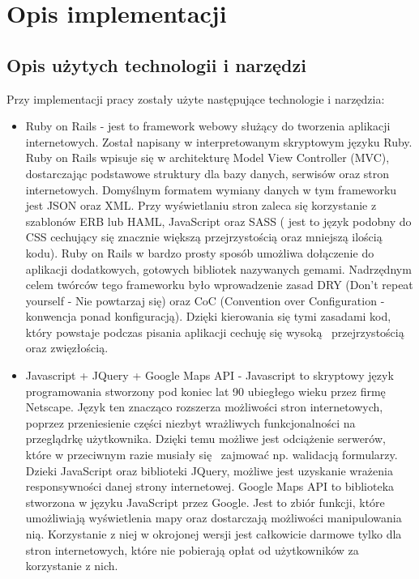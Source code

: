 \chapter{Opis implementacji}
\label{cha:uzywaneTechnologie}

\section{Opis użytych technologii i narzędzi}
\label{sec:technology}
Przy implementacji pracy zostały użyte następujące technologie i narzędzia:
\begin{itemize}
\item Ruby on Rails - jest to framework webowy służący do tworzenia aplikacji internetowych. Został napisany w interpretowanym skryptowym języku Ruby. Ruby on Rails wpisuje się w architekturę Model View Controller (MVC), dostarczając podstawowe struktury dla bazy danych, serwisów oraz stron internetowych. Domyślnym formatem wymiany danych w tym frameworku jest JSON oraz XML. Przy wyświetlaniu stron zaleca się korzystanie z szablonów ERB lub HAML, JavaScript oraz SASS ( jest to język podobny do CSS cechujący się znacznie większą przejrzystością oraz mniejszą ilością kodu). Ruby on Rails w bardzo prosty sposób umożliwa dołączenie do aplikacji dodatkowych, gotowych bibliotek nazywanych gemami. Nadrzędnym celem twórców tego frameworku było wprowadzenie zasad DRY (Don't repeat yourself - Nie powtarzaj się) oraz CoC (Convention over Configuration - konwencja ponad konfiguracją). Dzięki kierowania się tymi zasadami kod, który powstaje podczas pisania aplikacji cechuję się wysoką  przejrzystością oraz zwięzłością.\cite{rails}
\item Javascript + JQuery + Google Maps API - Javascript to skryptowy język programowania stworzony pod koniec lat 90 ubiegłego wieku przez firmę Netscape. Język ten znacząco rozszerza możliwości stron internetowych, poprzez przeniesienie części niezbyt wrażliwych funkcjonalności na przeglądrkę użytkownika. Dzięki temu możliwe jest odciążenie serwerów, które w przeciwnym razie musiały się  zajmować np. walidacją formularzy. Dzieki JavaScript oraz biblioteki JQuery, możliwe jest uzyskanie wrażenia responsywności danej strony internetowej. 
Google Maps API to biblioteka stworzona w języku JavaScript przez Google. Jest to zbiór funkcji, które umożliwiają wyświetlenia mapy oraz dostarczają możliwości manipulowania nią. Korzystanie z niej w okrojonej wersji jest całkowicie darmowe tylko dla stron internetowych, które nie pobierają opłat od użytkowników za korzystanie z nich.\\

\end{itemize}
